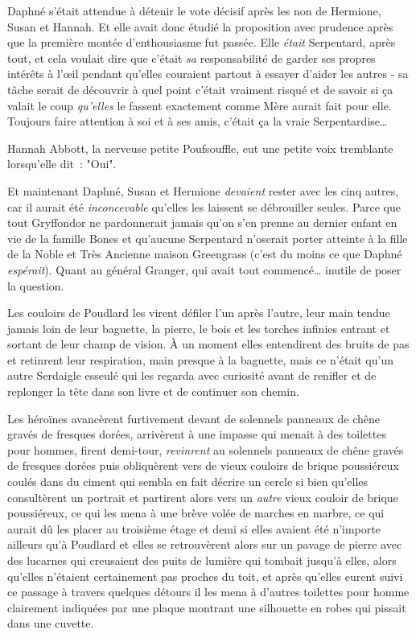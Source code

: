 Daphné s'était attendue à détenir le vote décisif après les non de Hermione, Susan et Hannah. Et elle avait donc étudié la proposition avec prudence après que la première montée d'enthousiasme fut passée. Elle \emph{était} Serpentard, après tout, et cela voulait dire que c'était \emph{sa} responsabilité de garder ses propres intérêts à l'œil pendant qu'elles couraient partout à essayer d'aider les autres - sa tâche serait de découvrir à quel point c'était vraiment risqué et de savoir si ça valait le coup \emph{qu'elles} le fassent exactement comme Mère aurait fait pour elle. Toujours faire attention à soi et à ses amis, c'était ça la vraie Serpentardise…

Hannah Abbott, la nerveuse petite Poufsouffle, eut une petite voix tremblante lorsqu'elle dit~: "Oui".

Et maintenant Daphné, Susan et Hermione \emph{devaient} rester avec les cinq autres, car il aurait été \emph{inconcevable} qu'elles les laissent se débrouiller seules. Parce que tout Gryffondor ne pardonnerait jamais qu'on s'en prenne au dernier enfant en vie de la famille Bones et qu'aucune Serpentard n'oserait porter atteinte à la fille de la Noble et Très Ancienne maison Greengrass (c'est du moins ce que Daphné \emph{espérait}). Quant au général Granger, qui avait tout commencé… inutile de poser la question.

Les couloirs de Poudlard les virent défiler l'un après l'autre, leur main tendue jamais loin de leur baguette, la pierre, le bois et les torches infinies entrant et sortant de leur champ de vision. À un moment elles entendirent des bruits de pas et retinrent leur respiration, main presque à la baguette, mais ce n'était qu'un autre Serdaigle esseulé qui les regarda avec curiosité avant de renifler et de replonger la tête dans son livre et de continuer son chemin.

Les héroïnes avancèrent furtivement devant de solennels panneaux de chêne gravés de fresques dorées, arrivèrent à une impasse qui menait à des toilettes pour hommes, firent demi-tour, \emph{revinrent} au solennels panneaux de chêne gravés de fresques dorées puis obliquèrent vers de vieux couloirs de brique poussiéreux coulés dans du ciment qui sembla en fait décrire un cercle si bien qu'elles consultèrent un portrait et partirent alors vers un \emph{autre} vieux couloir de brique poussiéreux, ce qui les mena à une brève volée de marches en marbre, ce qui aurait dû les placer au troisième étage et demi si elles avaient été n'importe ailleurs qu'à Poudlard et elles se retrouvèrent alors sur un pavage de pierre avec des lucarnes qui creusaient des puits de lumière qui tombait jusqu'à elles, alors qu'elles n'étaient certainement pas proches du toit, et après qu'elles eurent suivi ce passage à travers quelques détours il les mena à d'autres toilettes pour homme clairement indiquées par une plaque montrant une silhouette en robes qui pissait dans une cuvette.


